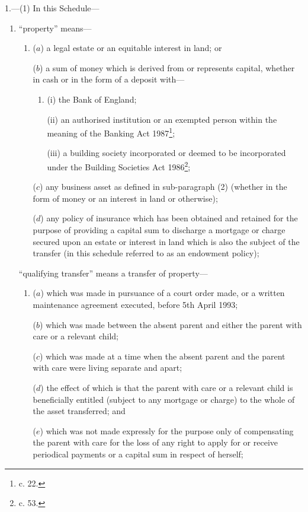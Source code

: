 \documentclass[a4paper]{article}
\begin{document}
1.—(1) In this Schedule—
\begin{enumerate}\item[]
“property” means—
\begin{enumerate}\item[]
($a$) a legal estate or an equitable interest in land; or

($b$) a sum of money which is derived from or represents capital, whether in cash or in the form of a deposit with—
\begin{enumerate}\item[]
(i) the Bank of England;

(ii) an authorised institution or an exempted person within the meaning of the Banking Act 1987\footnote{ c. 22.};

(iii) a building society incorporated or deemed to be incorporated under the Building Societies Act 1986\footnote{ c. 53.};
\end{enumerate}

\begin{sloppypar}
($c$) any business asset as defined in sub-paragraph (2) (whether in the form of money or an interest in land or otherwise);
\end{sloppypar}

($d$) any policy of insurance which has been obtained and retained for the purpose of providing a capital sum to discharge a mortgage or charge secured upon an estate or interest in land which is also the subject of the transfer (in this schedule referred to as an endowment policy);
\end{enumerate}

“qualifying transfer” means a transfer of property—
\begin{enumerate}\item[]
($a$) which was made in pursuance of a court order made, or a written maintenance agreement executed, before 5th April 1993;

($b$) which was made between the absent parent and either the parent with care or a relevant child;

($c$) which was made at a time when the absent parent and the parent with care were living separate and apart;

($d$) the effect of which is that the parent with care or a relevant child is beneficially entitled (subject to any mortgage or charge) to the whole of the asset transferred; and 

($e$) which was not made expressly for the purpose only of compensating the parent with care for the loss of any right to apply for or receive periodical payments or a capital sum in respect of herself;
\end{enumerate}


\end{enumerate}
\end{document}
